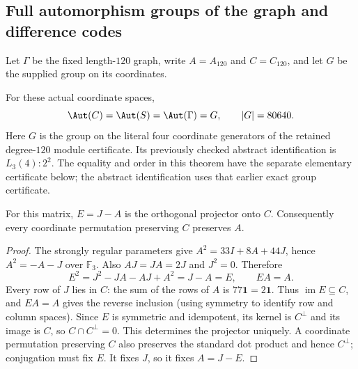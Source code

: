 \subsection{Full automorphism groups of the graph and difference codes}

Let $\Gamma$ be the fixed length-$120$ graph, write $A=A_{120}$ and $C=C_{120}$, and let $G$ be the supplied group on its coordinates.

\begin{theorem}\label{L050.120.main}
For these actual coordinate spaces,
\[
 \Aut(C)=\Aut(S)=\Aut(\Gamma)=G,\qquad |G|=80640.
\]
Here $G$ is the group on the literal four coordinate generators of the retained degree-$120$ module certificate. Its previously checked abstract identification is $L_3(4):2^2$. The equality and order in this theorem have the separate elementary certificate below; the abstract identification uses that earlier exact group certificate.
\end{theorem}

\begin{lemma}\label{L050.120.projection}
For this matrix, $E=J-A$ is the orthogonal projector onto $C$. Consequently every coordinate permutation preserving $C$ preserves $A$.
\end{lemma}
\begin{proof}
The strongly regular parameters give $A^2=33I+8A+44J$, hence $A^2=-A-J$ over $\mathbb F_3$. Also $AJ=JA=2J$ and $J^2=0$. Therefore
\[
 E^2=J^2-JA-AJ+A^2=J-A=E,\qquad EA=A.
\]
Every row of $J$ lies in $C$: the sum of the rows of $A$ is $77\mathbf1=2\mathbf1$. Thus $\operatorname{im}E\subseteq C$, and $EA=A$ gives the reverse inclusion (using symmetry to identify row and column spaces). Since $E$ is symmetric and idempotent, its kernel is $C^\perp$ and its image is $C$, so $C\cap C^\perp=0$. This determines the projector uniquely. A coordinate permutation preserving $C$ also preserves the standard dot product and hence $C^\perp$; conjugation must fix $E$. It fixes $J$, so it fixes $A=J-E$.
\end{proof}


